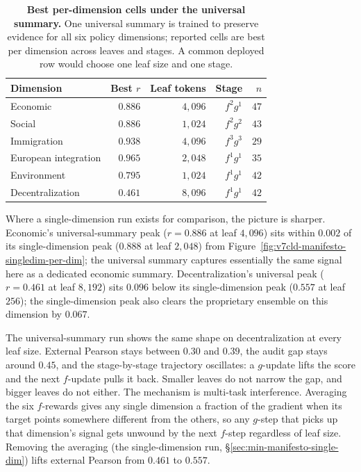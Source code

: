 \begin{table}[t]
  \centering
  \begin{tabular}{lrrrr}
    \toprule
    Dimension & Best $r$ & Leaf tokens & Stage & $n$ \\
    \midrule
    Economic & $0.886$ & $4{,}096$ & $f^2g^1$ & $47$ \\
    Social & $0.886$ & $1{,}024$ & $f^2g^2$ & $43$ \\
    Immigration & $0.938$ & $4{,}096$ & $f^3g^3$ & $29$ \\
    European integration & $0.965$ & $2{,}048$ & $f^1g^1$ & $35$ \\
    Environment & $0.795$ & $1{,}024$ & $f^1g^1$ & $42$ \\
    Decentralization & $0.461$ & $8{,}096$ & $f^1g^1$ & $42$ \\
    \bottomrule
  \end{tabular}
  \caption{\textbf{Best per-dimension cells under the universal summary.}
  One universal summary is trained to preserve evidence for all six policy
  dimensions; reported cells are best per dimension across leaves and
  stages. A common deployed row would choose one leaf size and one stage.}
  \label{tab:v6-joint-dim-best}
\end{table}

Where a single-dimension run exists for comparison, the picture is sharper.
Economic's universal-summary peak ($r=0.886$ at leaf $4{,}096$) sits within
$0.002$ of its single-dimension peak ($0.888$ at leaf $2{,}048$) from
Figure~\ref{fig:v7cld-manifesto-singledim-per-dim}; the universal summary
captures essentially the same signal here as a dedicated economic summary.
Decentralization's universal peak ($r=0.461$ at leaf $8{,}192$) sits $0.096$
below its single-dimension peak ($0.557$ at leaf $256$); the
single-dimension peak also clears the proprietary ensemble on this
dimension by $0.067$.

The universal-summary run shows the same shape on decentralization at every
leaf size. External Pearson stays between $0.30$ and $0.39$, the audit gap
stays around $0.45$, and the stage-by-stage trajectory oscillates: a
$g$-update lifts the score and the next $f$-update pulls it back. Smaller
leaves do not narrow the gap, and bigger leaves do not either. The mechanism
is multi-task interference. Averaging the six $f$-rewards gives any single
dimension a fraction of the gradient when its target points somewhere
different from the others, so any $g$-step that picks up that dimension's
signal gets unwound by the next $f$-step regardless of leaf size. Removing
the averaging (the single-dimension run,
\S\ref{sec:min-manifesto-single-dim}) lifts external Pearson from $0.461$ to
$0.557$.

